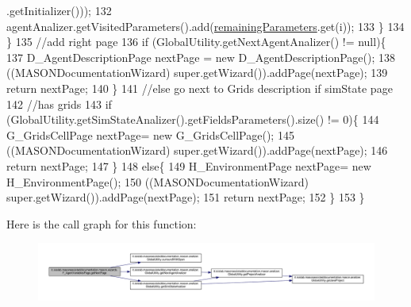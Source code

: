 \begin{DoxyCode}
      .getInitializer()));
132                 agentAnalizer.getVisitedParameters().add(\hyperlink{classit_1_1isislab_1_1masonassisteddocumentation_1_1mason_1_1wizards_1_1_f___agent_variables_page_a84c4e7c9e38a660e5befa94f5cac893f}{remainingParameters}.get(i));
133             \}
134         \}
135         \textcolor{comment}{//add right page}
136         \textcolor{keywordflow}{if} (GlobalUtility.getNextAgentAnalizer() != null)\{
137             D\_AgentDescriptionPage nextPage = \textcolor{keyword}{new} D\_AgentDescriptionPage();
138             ((MASONDocumentationWizard) super.getWizard()).addPage(nextPage);
139             \textcolor{keywordflow}{return} nextPage;
140         \}
141         \textcolor{comment}{//else go next to Grids description if simState page}
142         \textcolor{comment}{//has grids}
143         \textcolor{keywordflow}{if} (GlobalUtility.getSimStateAnalizer().getFieldsParameters().size() != 0)\{
144             G\_GridsCellPage nextPage= \textcolor{keyword}{new} G\_GridsCellPage();
145             ((MASONDocumentationWizard) super.getWizard()).addPage(nextPage); 
146             \textcolor{keywordflow}{return} nextPage; 
147         \}
148         \textcolor{keywordflow}{else}\{
149             H\_EnvironmentPage nextPage= \textcolor{keyword}{new} H\_EnvironmentPage();
150             ((MASONDocumentationWizard) super.getWizard()).addPage(nextPage); 
151             \textcolor{keywordflow}{return} nextPage; 
152         \}
153     \}
\end{DoxyCode}


Here is the call graph for this function\-:\nopagebreak
\begin{figure}[H]
\begin{center}
\leavevmode
\includegraphics[width=350pt]{classit_1_1isislab_1_1masonassisteddocumentation_1_1mason_1_1wizards_1_1_f___agent_variables_page_ad80f8e1ea42919b04a60b5e3dd52fd95_cgraph}
\end{center}
\end{figure}


